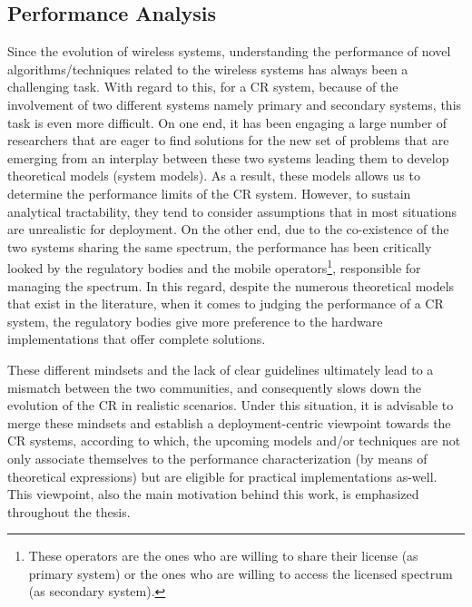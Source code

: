 \subsection{Performance Analysis}
Since the evolution of wireless systems, understanding the performance of novel algorithms/techniques related to the wireless systems has always been a challenging task. With regard to this, for a CR system, because of the involvement of two different systems namely primary and secondary systems, this task is even more difficult. On one end, it has been engaging a large number of researchers that are eager to find solutions for the new set of problems that are emerging from an interplay between these two systems leading them to develop theoretical models (system models). As a result, these models allows us to determine the performance limits of the CR system. However, to sustain analytical tractability, they tend to consider assumptions that in most situations are unrealistic for deployment.  %
 On the other end, due to the co-existence of the two systems sharing the same spectrum, the performance has been critically looked by the regulatory bodies and the mobile operators\footnote{These operators are the ones who are willing to share their license (as primary system) or the ones who are willing to access the licensed spectrum (as secondary system).}, responsible for managing the spectrum. In this regard, despite the numerous theoretical models that exist in the literature, when it comes to judging the performance of a CR system, the regulatory bodies give more preference to the hardware implementations that offer complete solutions. 

These different mindsets and the lack of clear guidelines ultimately lead to a mismatch between the two communities, and consequently slows down the evolution of the CR in realistic scenarios. Under this situation, it is advisable to merge these mindsets and establish a deployment-centric viewpoint towards the CR systems, according to which, the upcoming models and/or techniques are not only associate themselves to the performance characterization (by means of theoretical expressions) but are eligible for practical implementations as-well. This viewpoint, also the main motivation behind this work, is emphasized throughout the thesis. 

